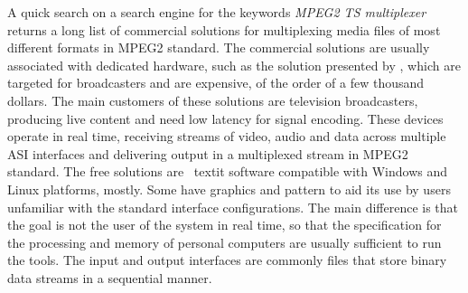 \documentclass[
	12pt,				%
	openright,			%
	twoside,			%
	a4paper,			%
	brazil,
	french,				%
	english
	]{abntex2}
\begin{document}
A quick search on a search engine for the keywords \textit{MPEG2 TS multiplexer} returns a long list of commercial solutions for multiplexing media files of most different formats in MPEG2 standard. The commercial solutions are usually associated with dedicated hardware, such as the solution presented by \cite{harris}, which are targeted for broadcasters and are expensive, of the order of a few thousand dollars. The main customers of these solutions are television broadcasters, producing live content and need low latency for signal encoding. These devices operate in real time, receiving streams of video, audio and data across multiple ASI interfaces and delivering output in a multiplexed stream in MPEG2 standard. The free solutions are \ textit {} software compatible with Windows and Linux platforms, mostly. Some have graphics and pattern to aid its use by users unfamiliar with the standard interface configurations. The main difference is that the goal is not the user of the system in real time, so that the specification for the processing and memory of personal computers are usually sufficient to run the tools. The input and output interfaces are commonly files that store binary data streams in a sequential manner.

\end{document}
